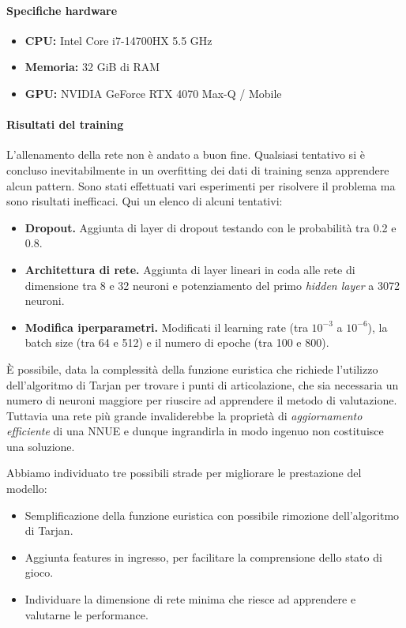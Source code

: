 \documentclass[a4paper,12pt]{article}
\begin{document}
    \paragraph{Specifiche hardware} \hfill

    \begin{itemize}
        \item \textbf{CPU:} Intel Core i7-14700HX 5.5 GHz
        \item \textbf{Memoria:} 32 GiB di RAM
        \item \textbf{GPU:} NVIDIA GeForce RTX 4070 Max-Q / Mobile
    \end{itemize}

    \paragraph{Risultati del training} \hfill

    L'allenamento della rete non è andato a buon fine. Qualsiasi tentativo si è concluso inevitabilmente in un overfitting dei dati di training senza apprendere alcun pattern.
    Sono stati effettuati vari esperimenti per risolvere il problema ma sono risultati inefficaci. Qui un elenco di alcuni tentativi:
    \begin{itemize}
        \item \textbf{Dropout.} Aggiunta di layer di dropout testando con le probabilità tra 0.2 e 0.8.
        \item \textbf{Architettura di rete.}  Aggiunta di layer lineari in coda alle rete di dimensione tra 8 e 32 neuroni e potenziamento del primo \textit{hidden layer} a 3072 neuroni.
        \item \textbf{Modifica iperparametri.} Modificati il learning rate (tra $10^{-3}$ a $10^{-6}$), la batch size (tra 64 e 512) e il numero di epoche (tra 100 e 800).
    \end{itemize}


    È possibile, data la complessità della funzione euristica che richiede l'utilizzo dell'algoritmo di Tarjan per trovare i punti di articolazione, che sia necessaria un numero di neuroni maggiore per riuscire ad apprendere il metodo di valutazione.
    Tuttavia una rete più grande invaliderebbe la proprietà di \textit{aggiornamento efficiente} di una NNUE e dunque ingrandirla in modo ingenuo non costituisce una soluzione.

    Abbiamo individuato tre possibili strade per migliorare le prestazione del modello:
    \begin{itemize}
        \item Semplificazione della funzione euristica con possibile rimozione dell'algoritmo di Tarjan.
        \item Aggiunta features in ingresso, per facilitare la comprensione dello stato di gioco.
        \item Individuare la dimensione di rete minima che riesce ad apprendere e valutarne le performance.
    \end{itemize}







    \newpage
    \printbibliography
\end{document}
